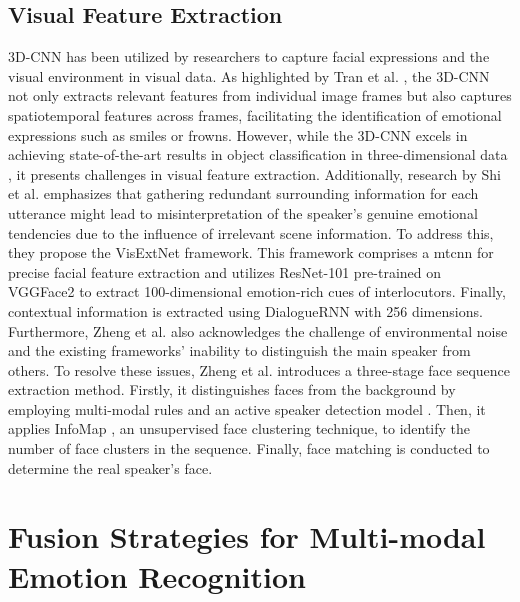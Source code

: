     \subsection{Visual Feature Extraction}
    3D-CNN has been utilized by researchers \cite{cmn,dialoguernn,bclstm,dialoguetrm} to capture facial expressions and the visual environment in visual data. As highlighted by Tran et al. \cite{trancnn}, the 3D-CNN not only extracts relevant features from individual image frames but also captures spatiotemporal features across frames, facilitating the identification of emotional expressions such as smiles or frowns. However, while the 3D-CNN excels in achieving state-of-the-art results in object classification in three-dimensional data \cite{ji3d}, it presents challenges in visual feature extraction. Additionally, research by Shi et al. \cite{multiemo} emphasizes that gathering redundant surrounding information for each utterance might lead to misinterpretation of the speaker's genuine emotional tendencies due to the influence of irrelevant scene information. To address this, they propose the VisExtNet framework. This framework comprises a \ac{mtcnn} \cite{mtcnn} for precise facial feature extraction and utilizes ResNet-101 \cite{resnet} pre-trained on VGGFace2 \cite{vggface2} to extract 100-dimensional emotion-rich cues of interlocutors. Finally, contextual information is extracted using DialogueRNN with 256 dimensions. Furthermore, Zheng et al. \cite{fmmt} also acknowledges the challenge of environmental noise and the existing frameworks' inability to distinguish the main speaker from others. To resolve these issues, Zheng et al. introduces a three-stage face sequence extraction method. Firstly, it distinguishes faces from the background by employing multi-modal rules and an active speaker detection model \cite{tao}. Then, it applies InfoMap \cite{rosvall}, an unsupervised face clustering technique, to identify the number of face clusters in the sequence. Finally, face matching is conducted to determine the real speaker's face.
    

\section[Fusion Strategies for Multi-Modal Emotion Recognition]{Fusion Strategies for Multi-modal Emotion \newline Recognition}

